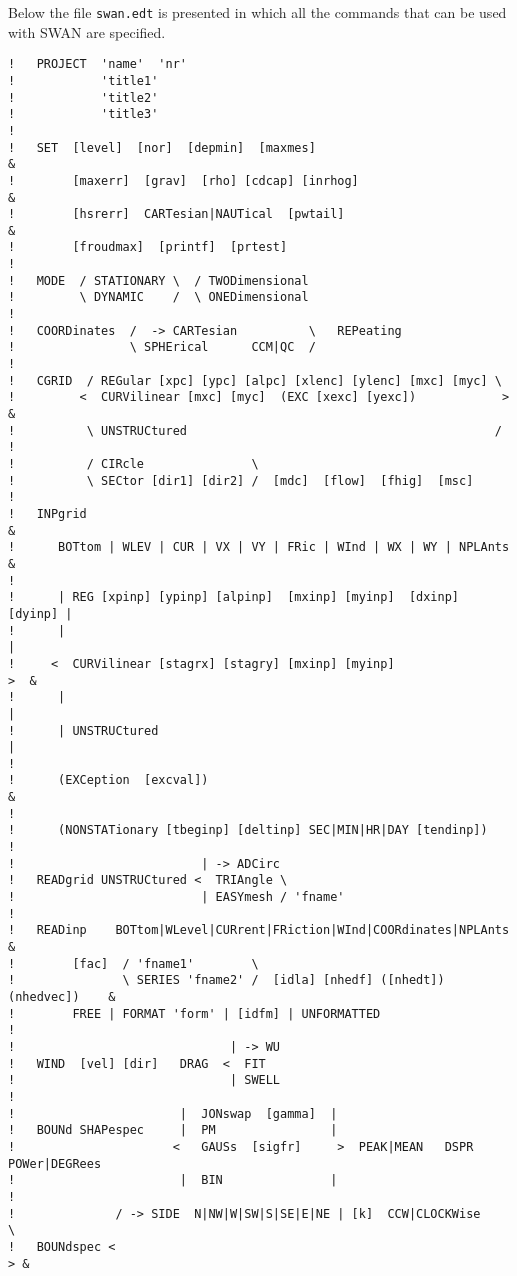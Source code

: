 \documentclass[12pt]{book}
\begin{document}
Below the file {\tt swan.edt} is presented in which all the commands that can be used with SWAN are specified.
\\[2ex]
\begin{verbatim}
!   PROJECT  'name'  'nr'
!            'title1'
!            'title2'
!            'title3'
!
!   SET  [level]  [nor]  [depmin]  [maxmes]                                 &
!        [maxerr]  [grav]  [rho] [cdcap] [inrhog]                           &
!        [hsrerr]  CARTesian|NAUTical  [pwtail]                             &
!        [froudmax]  [printf]  [prtest]
!
!   MODE  / STATIONARY \  / TWODimensional
!         \ DYNAMIC    /  \ ONEDimensional
!
!   COORDinates  /  -> CARTesian          \   REPeating
!                \ SPHErical      CCM|QC  /
!
!   CGRID  / REGular [xpc] [ypc] [alpc] [xlenc] [ylenc] [mxc] [myc] \
!         <  CURVilinear [mxc] [myc]  (EXC [xexc] [yexc])            >      &
!          \ UNSTRUCtured                                           /
!
!          / CIRcle               \
!          \ SECtor [dir1] [dir2] /  [mdc]  [flow]  [fhig]  [msc]
!
!   INPgrid                                                                 &
!      BOTtom | WLEV | CUR | VX | VY | FRic | WInd | WX | WY | NPLAnts      &
!
!      | REG [xpinp] [ypinp] [alpinp]  [mxinp] [myinp]  [dxinp] [dyinp] |
!      |                                                                |
!     <  CURVilinear [stagrx] [stagry] [mxinp] [myinp]                   >  &
!      |                                                                |
!      | UNSTRUCtured                                                   |
!
!      (EXCeption  [excval])                                                &
!
!      (NONSTATionary [tbeginp] [deltinp] SEC|MIN|HR|DAY [tendinp])
!
!                          | -> ADCirc
!   READgrid UNSTRUCtured <  TRIAngle \
!                          | EASYmesh / 'fname'
!
!   READinp    BOTtom|WLevel|CURrent|FRiction|WInd|COORdinates|NPLAnts      &
!        [fac]  / 'fname1'        \
!               \ SERIES 'fname2' /  [idla] [nhedf] ([nhedt]) (nhedvec])    &
!        FREE | FORMAT 'form' | [idfm] | UNFORMATTED
!
!                              | -> WU
!   WIND  [vel] [dir]   DRAG  <  FIT
!                              | SWELL
!
!                       |  JONswap  [gamma]  |
!   BOUNd SHAPespec     |  PM                |
!                      <   GAUSs  [sigfr]     >  PEAK|MEAN   DSPR  POWer|DEGRees
!                       |  BIN               |
!
!              / -> SIDE  N|NW|W|SW|S|SE|E|NE | [k]  CCW|CLOCKWise       \
!   BOUNdspec <                                                           > &

\end{verbatim}
\end{document}
